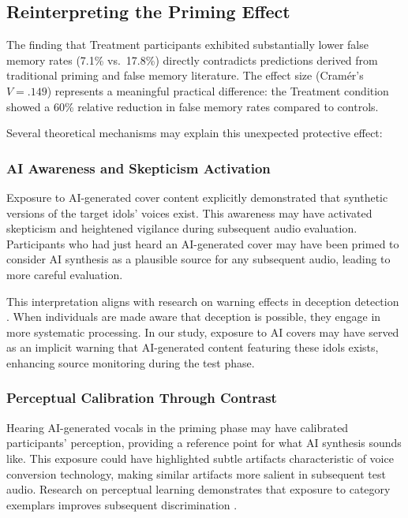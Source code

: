 \documentclass[12pt, a4paper]{article}
\begin{document}
\subsection{Reinterpreting the Priming Effect}

The finding that Treatment participants exhibited substantially lower false memory rates (7.1\% vs.\ 17.8\%) directly contradicts predictions derived from traditional priming and false memory literature. The effect size (Cramér's $V = .149$) represents a meaningful practical difference: the Treatment condition showed a 60\% relative reduction in false memory rates compared to controls.

Several theoretical mechanisms may explain this unexpected protective effect:

\subsubsection{AI Awareness and Skepticism Activation}

Exposure to AI-generated cover content explicitly demonstrated that synthetic versions of the target idols' voices exist. This awareness may have activated skepticism and heightened vigilance during subsequent audio evaluation. Participants who had just heard an AI-generated cover may have been primed to consider AI synthesis as a plausible source for any subsequent audio, leading to more careful evaluation.

This interpretation aligns with research on warning effects in deception detection \citep{pennycook2021psychology}. When individuals are made aware that deception is possible, they engage in more systematic processing. In our study, exposure to AI covers may have served as an implicit warning that AI-generated content featuring these idols exists, enhancing source monitoring during the test phase.

\subsubsection{Perceptual Calibration Through Contrast}

Hearing AI-generated vocals in the priming phase may have calibrated participants' perception, providing a reference point for what AI synthesis sounds like. This exposure could have highlighted subtle artifacts characteristic of voice conversion technology, making similar artifacts more salient in subsequent test audio. Research on perceptual learning demonstrates that exposure to category exemplars improves subsequent discrimination \citep{goldstone1998perceptual, nosofsky1986attention}.
\end{document}
